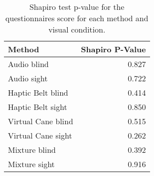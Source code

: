
\begin{table}[!htb]
\centering
\caption{Shapiro test p-value for the questionnaires score for each method and visual condition.}
\label{tab:shapiro_questionnaires}
\begin{tabular}{lr}
\toprule
            Method &  Shapiro P-Value \\
\midrule
       Audio blind &            0.827 \\
       Audio sight &            0.722 \\
 Haptic Belt blind &            0.414 \\
 Haptic Belt sight &            0.850 \\
Virtual Cane blind &            0.515 \\
Virtual Cane sight &            0.262 \\
     Mixture blind &            0.392 \\
     Mixture sight &            0.916 \\
\bottomrule
\end{tabular}
\end{table}

